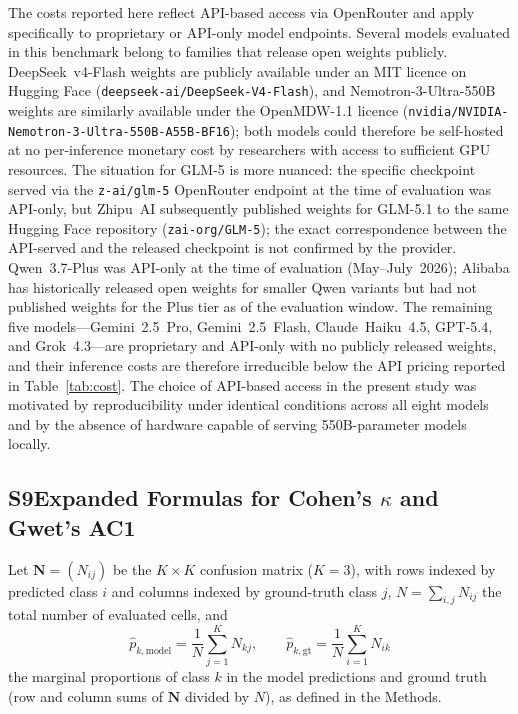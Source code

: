 \documentclass[../main.tex]{subfiles}
\begin{document}
The costs reported here reflect API-based access via OpenRouter and apply
specifically to proprietary or API-only model endpoints.
Several models evaluated in this benchmark belong to families that release
open weights publicly.
DeepSeek~v4-Flash weights are publicly available under an MIT licence on
Hugging Face (\texttt{deepseek-ai/DeepSeek-V4-Flash}), and
Nemotron-3-Ultra-550B weights are similarly available under the OpenMDW-1.1
licence (\texttt{nvidia/NVIDIA-Nemotron-3-Ultra-550B-A55B-BF16}); both models
could therefore be self-hosted at no per-inference monetary cost by researchers
with access to sufficient GPU resources.
The situation for GLM-5 is more nuanced: the specific checkpoint served via the
\texttt{z-ai/glm-5} OpenRouter endpoint at the time of evaluation was
API-only, but Zhipu~AI subsequently published weights for GLM-5.1 to the same
Hugging Face repository (\texttt{zai-org/GLM-5}); the exact correspondence
between the API-served and the released checkpoint is not confirmed by the
provider.
Qwen~3.7-Plus was API-only at the time of evaluation (May--July~2026); Alibaba
has historically released open weights for smaller Qwen variants but had not
published weights for the Plus tier as of the evaluation window.
The remaining five models---Gemini~2.5~Pro, Gemini~2.5~Flash, Claude~Haiku~4.5,
GPT-5.4, and Grok~4.3---are proprietary and API-only with no publicly released
weights, and their inference costs are therefore irreducible below the API
pricing reported in Table~\ref{tab:cost}.
The choice of API-based access in the present study was motivated by
reproducibility under identical conditions across all eight models and by the
absence of hardware capable of serving 550B-parameter models locally.

\subsection*{S9\quad Expanded Formulas for Cohen's $\kappa$ and Gwet's AC1}
\label{sec:si-metrics}

Let $\mathbf{N} = (N_{ij})$ be the $K \times K$ confusion matrix ($K = 3$),
with rows indexed by predicted class $i$ and columns indexed by ground-truth
class $j$, $N = \sum_{i,j} N_{ij}$ the total number of evaluated cells, and
\begin{equation*}
  \hat{p}_{k,\text{model}} = \frac{1}{N}\sum_{j=1}^{K} N_{kj},
  \qquad
  \hat{p}_{k,\text{gt}}    = \frac{1}{N}\sum_{i=1}^{K} N_{ik}
\end{equation*}
the marginal proportions of class $k$ in the model predictions and ground
truth (row and column sums of $\mathbf{N}$ divided by $N$), as defined in
the Methods.
\end{document}
